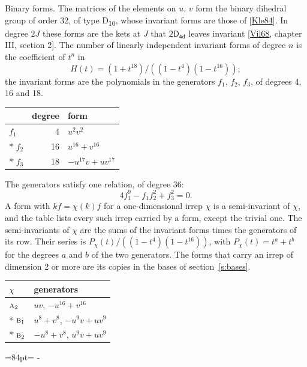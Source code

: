 \documentclass[10pt,a4paper]{article}
\makeatletter
\renewcommand\paragraph{\@startsection{paragraph}{4}{\z@}{1.5ex plus .5ex minus .2ex}{-1em}%
  {\normalfont\small\sffamily\bfseries\color{parttitle}}}
\newcommand{\needspace}[1]{\par\penalty-100\begingroup\dimen0=#1\relax\dimen2=\pagegoal
  \advance\dimen2-\pagetotal\ifdim\dimen0>\dimen2\relax\ifdim\dimen2>0pt\vfil\break\fi\fi
  \endgroup}
\numberwithin{equation}{section}
\newcommand{\grp}[1]{\mathsf{#1}}
\newcommand{\irr}[1]{\text{\normalfont\scshape #1}}
\makeatother
\begin{document}
\paragraph{Binary forms.}
The matrices of the elements on $u$, $v$ form the binary dihedral group of order 32, of type D\textsubscript{10}, whose invariant forms are those of [\href{../../../REFERENCES.pdf\#ref.Kle84}{Kle84}]. In degree $2J$ these forms are the kets at $J$ that $\grp{2D_{4d}}$ leaves invariant [\href{../../../REFERENCES.pdf\#ref.Vil68}{Vil68}, chapter III, section 2]. \label{n:head.degree}\label{n:head.form}The number of linearly independent invariant forms of degree $n$ is the coefficient of $t^n$ in
\begin{equation}\label{e:molien}H(t) = (1 + t^{18})/((1-t^{4})(1-t^{16}));\end{equation}
the invariant forms are the polynomials in the generators $f_1$, $f_2$, $f_3$, of degrees 4, 16 and 18.
{\small\begin{longtable}{@{}lrl@{}}\toprule
& degree & form\\\midrule\endhead
\bottomrule\endfoot\endlastfoot
$f_{1}$ & 4 & $u^{2}v^{2}$\\*
$f_{2}$ & 16 & $u^{16} + v^{16}$\\*
$f_{3}$ & 18 & $-u^{17}v + uv^{17}$\\
\bottomrule\end{longtable}}
The generators satisfy one relation, of degree 36:
\begin{equation}\label{e:relation}4f_{1}^{9} - f_{1}f_{2}^{2} + f_{3}^{2} = 0.\end{equation}
A form with $k f = \chi(k) f$ for a one-dimensional irrep $\chi$ is a semi-invariant of $\chi$, and the table lists every such irrep carried by a form, except the trivial one. \label{n:head.generators}The semi-invariants of $\chi$ are the sums of the invariant forms times the generators of its row. Their series is $P_\chi(t)/((1-t^{4})(1-t^{16}))$, with $P_\chi(t) = t^{a} + t^{b}$ for the degrees $a$ and $b$ of the two generators. The forms that carry an irrep of dimension 2 or more are its copies in the bases of section~\ref{s:bases}.
{\small\begin{longtable}{@{}ll@{}}\toprule
$\chi$ & generators\\\midrule\endhead
\bottomrule\endfoot\endlastfoot
$\irr{a}_{2}$ & $uv$, $-u^{16} + v^{16}$\\*
$\irr{b}_{1}$ & $u^{8} + v^{8}$, $-u^{9}v + uv^{9}$\\*
$\irr{b}_{2}$ & $-u^{8} + v^{8}$, $u^{9}v + uv^{9}$\\
\bottomrule\end{longtable}}
\needspace{84pt}
\end{document}
